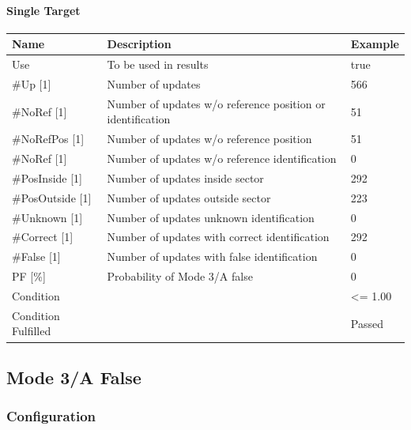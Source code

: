 \paragraph{Single Target}

\begin{center}
 \begin{table}[H]
  \begin{tabularx}{\textwidth}{ | l | X |  l | }
    \hline
    \textbf{Name} & \textbf{Description} & \textbf{Example} \\ \hline
    Use & To be used in results & true \\ \hline
    \#Up [1] & Number of updates & 566 \\ \hline
    \#NoRef [1] & Number of updates w/o reference position or identification & 51 \\ \hline
    \#NoRefPos [1] & Number of updates w/o reference position  & 51 \\ \hline
    \#NoRef [1] & Number of updates w/o reference identification & 0 \\ \hline
    \#PosInside [1] & Number of updates inside sector & 292 \\ \hline
    \#PosOutside [1] & Number of updates outside sector & 223 \\ \hline
    \#Unknown [1] & Number of updates unknown identification & 0 \\ \hline
    \#Correct [1] & Number of updates with correct identification & 292 \\ \hline
    \#False [1] & Number of updates with false identification & 0 \\ \hline
    PF [\%] & Probability of Mode 3/A false & 0 \\ \hline
    Condition &  & <= 1.00 \\ \hline
    Condition Fulfilled &  & Passed \\ \hline
\end{tabularx}
\end{table}
\end{center}

\subsection{Mode 3/A False}
\label{sec:eval_req_m3a_false} 

\subsubsection{Configuration}

